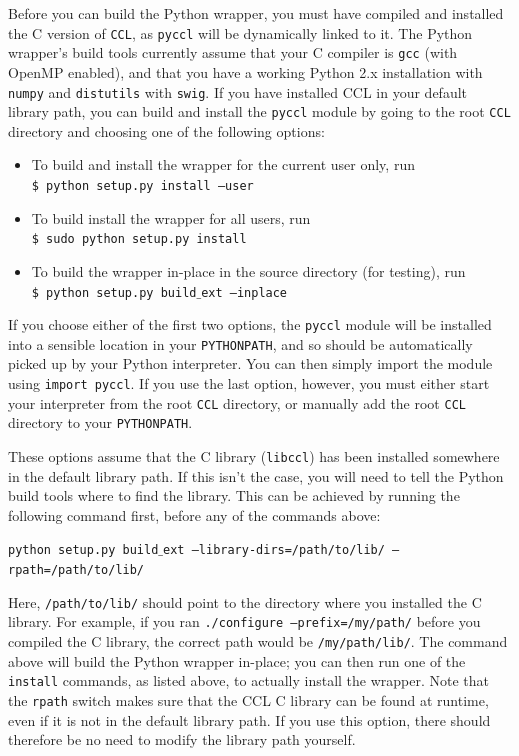 \documentclass[\docopts]{\docclass}
\begin{document}
Before you can build the Python wrapper, you must have compiled and installed the C version of {\tt CCL}, as {\tt pyccl} will be dynamically linked to it. The Python wrapper's build tools currently assume that your C compiler is {\tt gcc} (with OpenMP enabled), and that you have a working Python 2.x installation with {\tt numpy} and {\tt distutils} with {\tt swig}. If you have installed CCL in your default library path, you can build and install the {\tt pyccl} module by going to the root {\tt CCL} directory and choosing one of the following options:
\begin{itemize}
 \item To build and install the wrapper for the current user only, run \\
 {\tt \$ python setup.py install --user}
 \item To build install the wrapper for all users, run \\
 {\tt \$ sudo python setup.py install}
 \item To build the wrapper in-place in the source directory (for testing), run \\
 {\tt \$ python setup.py build$\_$ext --inplace}
\end{itemize}
If you choose either of the first two options, the {\tt pyccl} module will be installed into a sensible location in your {\tt PYTHONPATH}, and so should be automatically picked up by your Python interpreter. You can then simply import the module using {\tt import pyccl}. If you use the last option, however, you must either start your interpreter from the root {\tt CCL} directory, or manually add the root {\tt CCL} directory to your {\tt PYTHONPATH}.

These options assume that the C library ({\tt libccl}) has been installed somewhere in the default library path. If this isn't the case, you will need to tell the Python build tools where to find the library. This can be achieved by running the following command first, before any of the commands above:

\texttt{python setup.py build$\_$ext --library-dirs=/path/to/lib/ --rpath=/path/to/lib/}

Here, {\tt /path/to/lib/} should point to the directory where you installed the C library. For example, if you ran {\tt ./configure --prefix=/my/path/} before you compiled the C library, the correct path would be {\tt /my/path/lib/}. The command above will build the Python wrapper in-place; you can then run one of the {\tt install} commands, as listed above, to actually install the wrapper. Note that the {\tt rpath} switch makes sure that the CCL C library can be found at runtime, even if it is not in the default library path. If you use this option, there should therefore be no need to modify the library path yourself.
\end{document}

